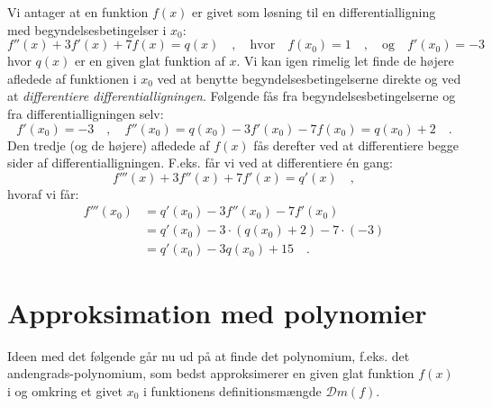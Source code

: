 \begin{example} \label{exampElemDiff}
Vi antager at en funktion $f(x)$ er givet som løsning til en differentialligning med begyndelsesbetingelser i $x_{0}$:
\begin{equation} \label{eqDifflign}
f''(x) + 3f'(x) + 7f(x) = q(x) \quad , \quad \textrm{hvor} \quad f(x_{0}) = 1 \quad , \quad \textrm{og} \quad f'(x_{0}) = -3
\end{equation}
hvor $q(x)$ er en given glat funktion af $x$.
Vi kan igen rimelig let finde de højere afledede af funktionen i $x_{0}$ ved at benytte begyndelsesbetingelserne direkte og ved at {\emph{differentiere differentialligningen}}. Følgende fås fra begyndelsesbetingelserne og fra differentialligningen selv:
\begin{equation}
f'(x_{0}) = -3\quad , \quad f''(x_{0})= q(x_{0}) - 3f'(x_{0}) - 7f(x_{0}) = q(x_{0}) + 2 \quad .
\end{equation}
Den tredje (og de højere) afledede af $f(x)$ fås derefter ved at differentiere begge sider af differentialligningen. F.eks. får vi ved at differentiere \'{e}n gang:
\begin{equation}
f'''(x) + 3f''(x) + 7f'(x) = q'(x)\quad ,
\end{equation}
hvoraf vi får:
\begin{equation}
\begin{aligned}
f'''(x_{0}) &= q'(x_{0}) - 3f''(x_{0}) - 7f'(x_{0}) \\
&= q'(x_{0}) - 3\cdot(q(x_{0}) + 2) - 7\cdot(-3) \\
&= q'(x_{0}) - 3q(x_{0}) +15 \quad .
\end{aligned}
\end{equation}
\end{example}

\section{Approksimation med polynomier}

Ideen med det følgende går nu ud på at finde det polynomium, f.eks. det andengrads-polynomium, som bedst approksimerer en given glat funktion $f(x)$ i og omkring et givet $x_{0}$ i funktionens definitionsmængde $\mathcal{D}m(f)$. \\

